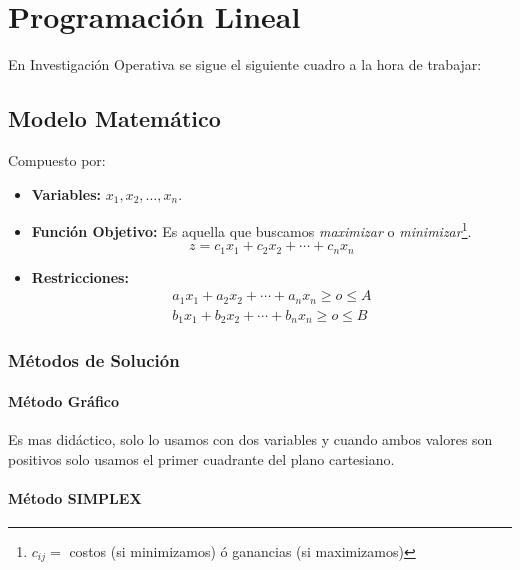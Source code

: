 \documentclass[10pt,a4paper]{book}
\begin{document}

\chapter{Programación Lineal}
En Investigación Operativa se sigue el siguiente cuadro a la hora de trabajar:
\begin{center}
\end{center}
\section{Modelo Matemático}
Compuesto por:
\begin{itemize}
\item \textbf{Variables:} $x_1,x_2,\ldots ,x_n$.
\item \textbf{Función Objetivo:} Es aquella que buscamos \textit{maximizar} o \textit{minimizar}\footnote{$c_{ij}=$ costos (si minimizamos) ó ganancias (si maximizamos)}. 
$$z = c_1 x_1 + c_2 x_2 + \cdots +c_n x_n$$
\item \textbf{Restricciones:}
\begin{align*}
a_1 x_1 + a_2 x_2 + \cdots + a_n x_n \geq o \leq A\\
b_1 x_1 + b_2 x_2 + \cdots + b_n x_n \geq o \leq B
\end{align*}
\end{itemize}
\subsection{Métodos de Solución}
\subsubsection{Método Gráfico}
Es mas didáctico, solo lo usamos con dos variables y cuando ambos valores son positivos solo usamos el primer cuadrante del plano cartesiano.
\subsubsection{Método SIMPLEX}
\end{document}
